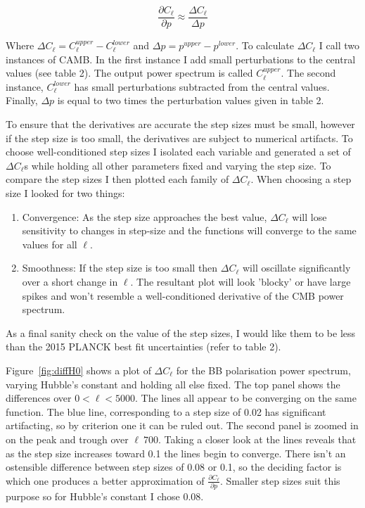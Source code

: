 \begin{equation}
\frac{\partial C_{\ell}}{\partial p} \approx \frac{\Delta C_{\ell}}{\Delta p}
\end{equation}
 
Where $\Delta C_{\ell} = C^{upper}_{\ell} - C^{lower}_{\ell}$ and $\Delta p = p^{upper} - p^{lower}$. To calculate $\Delta C_{\ell}$ I call two instances of CAMB. In the first instance I add small perturbations to the central values (see table 2). The output power spectrum is called $C^{upper}_{\ell}$. The second instance, $C^{lower}_{\ell}$ has small perturbations subtracted from the central values. Finally, $\Delta p$ is equal to two times the perturbation values given in table 2.

To ensure that the derivatives are accurate the step sizes must be small, however if the step size is too small, the derivatives are subject to numerical artifacts. To choose well-conditioned step sizes I isolated each variable and generated a set of $\Delta C_{\ell}$s while holding all other parameters fixed and varying the step size. To compare the step sizes I then plotted each family of $\Delta C_{\ell}$. When choosing a step size I looked for two things:

\begin{enumerate}
\item Convergence: As the step size approaches the best value, $\Delta C_{\ell}$ will lose sensitivity to changes in step-size and the functions will converge to the same values for all $\ell$.

\item Smoothness: If the step size is too small then $\Delta C_{\ell}$ will oscillate significantly over a short change in $\ell$. The resultant plot will look 'blocky' or have large spikes and won't resemble a well-conditioned derivative of the CMB power spectrum.
\end{enumerate}

As a final sanity check on the value of the step sizes, I would like them to be less than the 2015 PLANCK best fit uncertainties (refer to table 2).
 
Figure~\ref{fig:diffH0} shows a plot of $\Delta C_{\ell}$ for the BB polarisation power spectrum, varying Hubble's constant and holding all else fixed. The top panel shows the differences over $ 0 < \ell < 5000$. The lines all appear to be converging on the same function. The blue line, corresponding to a step size of 0.02 has significant artifacting, so by criterion one it can be ruled out. The second panel is zoomed in on the peak and trough over $\ell ~ 700$. Taking a closer look at the lines reveals that as the step size increases toward 0.1 the lines begin to converge. There isn't an ostensible difference between step sizes of 0.08 or 0.1, so the deciding factor is which one produces a better approximation of $\frac{\partial C_{\ell}}{\partial p}$. Smaller step sizes suit this purpose so for Hubble's constant I chose 0.08.
 

